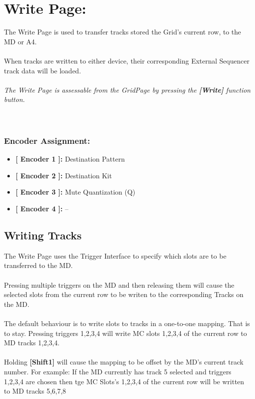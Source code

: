 \chapter{Write Page:}

The Write Page is used to transfer tracks stored the Grid's current row, to the MD or A4.\\
\\
When tracks are written to either device, their corresponding External Sequencer track data will be loaded.
\\\\
\textit{The Write Page is assessable from the GridPage by pressing the  \textbf{[Write]} function button.}
\\\\
\\
\subsection{Encoder Assignment:}
\begin{itemize}
	\item \textbf{[ Encoder 1 ]: }Destination Pattern
	\item \textbf{[ Encoder 2 ]: }Destination Kit
	\item \textbf{[ Encoder 3 ]: }Mute Quantization (Q)
	\item \textbf{[ Encoder 4 ]: }--
\end{itemize}
\section{Writing Tracks}
The Write Page uses the Trigger Interface to specify which slots are to be transferred to the MD.\\
\\
Pressing multiple triggers on the MD and then releasing them will cause the selected slots from the current row to be writen to the corresponding Tracks on the MD.
\\
\\The default behaviour is to write slots to tracks in a one-to-one mapping. That is to stay. Pressing triggers 1,2,3,4 will write MC slots 1,2,3,4 of the current row to MD tracks 1,2,3,4.\\
\\
Holding  \textbf{[Shift1]} will cause the mapping to be offset by the MD's current track number. For example: If the MD currently has track 5 selected and triggers 1,2,3,4 are chosen then tge MC Slots's 1,2,3,4 of the current row will be written to MD tracks 5,6,7,8
